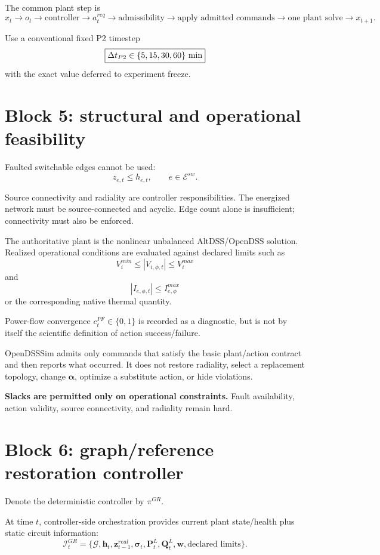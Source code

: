 \documentclass[11pt]{article}
\begin{document}
The common plant step is
\[
x_t\rightarrow o_t\rightarrow \text{controller}\rightarrow a_t^{req}
\rightarrow\text{admissibility}\rightarrow\text{apply admitted commands}
\rightarrow\text{one plant solve}\rightarrow x_{t+1}.
\]

Use a conventional fixed P2 timestep
\[
\boxed{\Delta t_{P2}\in\{5,15,30,60\}\ {\rm min}}
\]
with the exact value deferred to experiment freeze.

\section{Block 5: structural and operational feasibility}
Faulted switchable edges cannot be used:
\[
\boxed{z_{e,t}\le h_{e,t},\qquad e\in\mathcal E^{sw}.}
\]

Source connectivity and radiality are controller responsibilities. The energized
network must be source-connected and acyclic. Edge count alone is insufficient;
connectivity must also be enforced.

The authoritative plant is the nonlinear unbalanced AltDSS/OpenDSS solution.
Realized operational conditions are evaluated against declared limits such as
\[
\boxed{V_i^{min}\le |V_{i,\phi,t}|\le V_i^{max}}
\]
and
\[
\boxed{|I_{e,\phi,t}|\le I_{e,\phi}^{max}}
\]
or the corresponding native thermal quantity.

Power-flow convergence $c_t^{PF}\in\{0,1\}$ is recorded as a diagnostic, but is not
by itself the scientific definition of action success/failure.

OpenDSSSim admits only commands that satisfy the basic plant/action contract and
then reports what occurred. It does not restore radiality, select a replacement
topology, change $\boldsymbol\alpha$, optimize a substitute action, or hide violations.

\textbf{Slacks are permitted only on operational constraints.}
Fault availability, action validity, source connectivity, and radiality remain hard.

\section{Block 6: graph/reference restoration controller}
Denote the deterministic controller by $\pi^{GR}$.

At time $t$, controller-side orchestration provides current plant state/health plus
static circuit information:
\[
\mathcal I_t^{GR}
=
\{\mathcal G,\mathbf h_t,\mathbf z_{t-1}^{real},\boldsymbol\sigma_t,
\mathbf P_t^L,\mathbf Q_t^L,\mathbf w,\text{declared limits}\}.
\]
\end{document}
